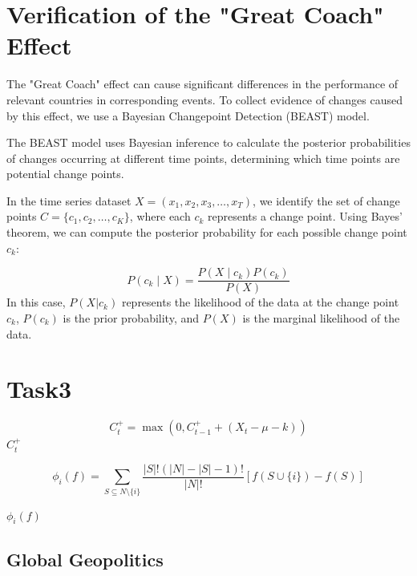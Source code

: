 \documentclass[12pt]{article}  %
\begin{document}
\section{Verification of the "Great Coach" Effect}
The "Great Coach" effect can cause significant differences in the performance of relevant countries in corresponding events. To collect evidence of changes caused by this effect, we use a Bayesian Changepoint Detection (BEAST) model.

The BEAST model uses Bayesian inference to calculate the posterior probabilities of changes occurring at different time points, determining which time points are potential change points.


	
In the time series dataset \(X = (x_1, x_2, x_3, \ldots, x_T)\), we identify the set of change points \(C = \{c_1, c_2, \ldots, c_K\}\), where each \(c_k\) represents a change point.
Using Bayes' theorem, we can compute the posterior probability for each possible change point $c_k$:

\begin{equation}
	P(c_k \mid X) = \frac{P(X \mid c_k) P(c_k)}{P(X)}
\end{equation}
In this case, \( P(X|c_k) \) represents the likelihood of the data at the change point \( c_k \), \( P(c_k) \) is the prior probability, and \( P(X) \) is the marginal likelihood of the data.

\section{Task3}


	




\begin{equation}
	C_t^+ = \max(0, C_{t-1}^+ + (X_t - \mu - k))
\end{equation}
$C_t^+ $







	
	\begin{equation}
		\phi_i(f) = \sum_{S \subseteq N \setminus \{i\}} \frac{|S|!(|N| - |S| - 1)!}{|N|!} [f(S \cup \{i\}) - f(S)]
	\end{equation}



$\phi_i(f)$

\subsection{Global Geopolitics}
\end{document}
